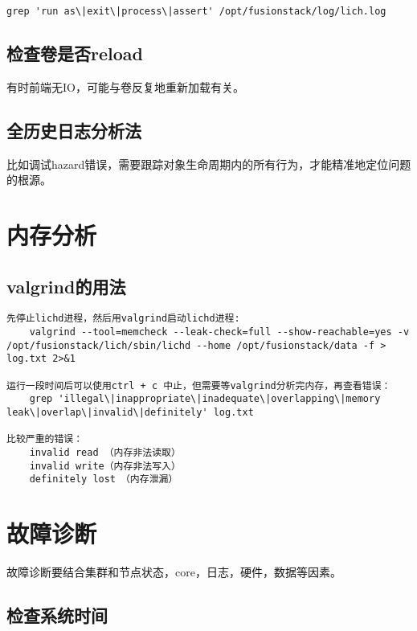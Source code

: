 \begin{lstlisting}
grep 'run as\|exit\|process\|assert' /opt/fusionstack/log/lich.log
\end{lstlisting}

\subsection{检查卷是否reload}

有时前端无IO，可能与卷反复地重新加载有关。

\subsection{全历史日志分析法}

比如调试hazard错误，需要跟踪对象生命周期内的所有行为，才能精准地定位问题的根源。

\section{内存分析}

\subsection{valgrind的用法}

\begin{lstlisting}
先停止lichd进程，然后用valgrind启动lichd进程:
    valgrind --tool=memcheck --leak-check=full --show-reachable=yes -v /opt/fusionstack/lich/sbin/lichd --home /opt/fusionstack/data -f > log.txt 2>&1

运行一段时间后可以使用ctrl + c 中止，但需要等valgrind分析完内存，再查看错误：
    grep 'illegal\|inappropriate\|inadequate\|overlapping\|memory leak\|overlap\|invalid\|definitely' log.txt

比较严重的错误：　　　
    invalid read （内存非法读取）
    invalid write（内存非法写入）
    definitely lost　（内存泄漏）
\end{lstlisting}

\section{故障诊断}

故障诊断要结合集群和节点状态，core，日志，硬件，数据等因素。

\subsection{检查系统时间}

